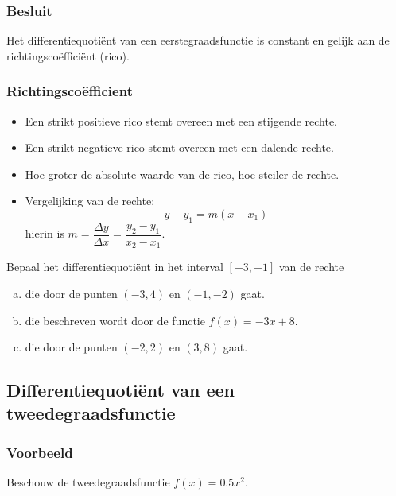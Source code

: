 \documentclass[12pt]{article}
\begin{document}
\subsubsection{Besluit}

Het differentiequotiënt van een eerstegraadsfunctie is constant en gelijk aan de richtingscoëfficiënt (rico).

\subsubsection{Richtingscoëfficient}
\begin{itemize}
\item Een strikt positieve rico stemt overeen met een stijgende rechte.
\item Een strikt negatieve rico stemt overeen met een dalende rechte.
\item Hoe groter de absolute waarde van de rico, hoe steiler de rechte.
\item Vergelijking van de rechte:
  $$y-y_1=m(x-x_1)$$
  hierin is $m=\dfrac{\Delta y}{\Delta x}=\dfrac{y_2-y_1}{x_2-x_1}$.
\end{itemize}

\begin{oefening}
  Bepaal het differentiequotiënt in het interval $[-3,-1]$ van de rechte
  \begin{enumerate}[(a)]
  \item die door de punten $(-3, 4)$ en $(-1, -2)$ gaat.
  \item die beschreven wordt door de functie $f(x)=-3x+8$.
  \item die door de punten $(-2, 2)$ en $(3, 8)$ gaat.
  \end{enumerate}
\end{oefening}

\pagebreak
\subsection{Differentiequotiënt van een tweedegraadsfunctie}

\subsubsection{Voorbeeld}

Beschouw de tweedegraadsfunctie $f(x)=0.5x^2$.
\end{document}
